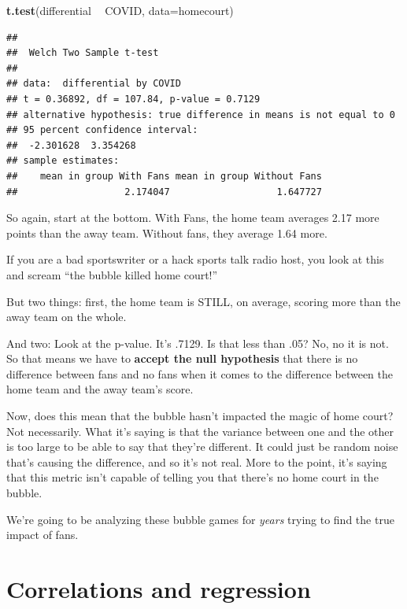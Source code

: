 \documentclass[
]{book}
\newenvironment{Shaded}{\begin{snugshade}}{\end{snugshade}}
\newcommand{\DataTypeTok}[1]{\textcolor[rgb]{0.13,0.29,0.53}{#1}}
\newcommand{\KeywordTok}[1]{\textcolor[rgb]{0.13,0.29,0.53}{\textbf{#1}}}
\newcommand{\NormalTok}[1]{#1}
\newcommand{\OperatorTok}[1]{\textcolor[rgb]{0.81,0.36,0.00}{\textbf{#1}}}
\newcommand{\StringTok}[1]{\textcolor[rgb]{0.31,0.60,0.02}{#1}}
\begin{document}
\begin{Shaded}
\begin{Highlighting}[]
\KeywordTok{t.test}\NormalTok{(differential }\OperatorTok{~}\StringTok{ }\NormalTok{COVID, }\DataTypeTok{data=}\NormalTok{homecourt)}
\end{Highlighting}
\end{Shaded}

\begin{verbatim}
## 
## 	Welch Two Sample t-test
## 
## data:  differential by COVID
## t = 0.36892, df = 107.84, p-value = 0.7129
## alternative hypothesis: true difference in means is not equal to 0
## 95 percent confidence interval:
##  -2.301628  3.354268
## sample estimates:
##    mean in group With Fans mean in group Without Fans 
##                   2.174047                   1.647727
\end{verbatim}

So again, start at the bottom. With Fans, the home team averages 2.17 more points than the away team. Without fans, they average 1.64 more.

If you are a bad sportswriter or a hack sports talk radio host, you look at this and scream ``the bubble killed home court!''

But two things: first, the home team is STILL, on average, scoring more than the away team on the whole.

And two: Look at the p-value. It's .7129. Is that less than .05? No, no it is not. So that means we have to \textbf{accept the null hypothesis} that there is no difference between fans and no fans when it comes to the difference between the home team and the away team's score.

Now, does this mean that the bubble hasn't impacted the magic of home court? Not necessarily. What it's saying is that the variance between one and the other is too large to be able to say that they're different. It could just be random noise that's causing the difference, and so it's not real. More to the point, it's saying that this metric isn't capable of telling you that there's no home court in the bubble.

We're going to be analyzing these bubble games for \emph{years} trying to find the true impact of fans.

\hypertarget{correlations-and-regression}{%
\chapter{Correlations and regression}\label{correlations-and-regression}}
\end{document}
